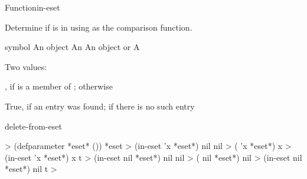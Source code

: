 \documentclass[10pt,twoside,english,pdftex]{article}
\begin{document}

\begin{functiondoc}{Function}{in-eset}{
    }
%
  
\fnsyntax

\fnpurpose Determine if  is in  using  as the
comparison function.

\fnpackage {}

\fnmodule {}

\fnargs
\begin{args}{symbol}
\arg[item] An object
\arg[eset] An 
 An object or \nil{}
\arg[present-p] A 
\end{args}

\fnreturns Two values:
\begin{tightitemize}
\item {}, if  is a member of ; otherwise \nil{}
\item True, if an entry was found; \nil{} if there is no such entry
\end{tightitemize}

\begin{alsos}{delete-from-eset}
\also[memq]
\end{alsos}

\fnexamples
{}%
%
%
\W\supp
\begin{example}
  > (defparameter *eset* ())
  *eset
  > (in-eset 'x *eset*)
  nil
  nil
  > ( 'x *eset*)
  x
  > (in-eset 'x *eset*)
  x
  t\goodpagebreak
  > (in-eset nil *eset*)
  nil
  nil
  > ( nil *eset*)
  nil
  > (in-eset nil *eset*)
  nil
  t
  > 
\end{example}

\end{functiondoc}

\end{document}

